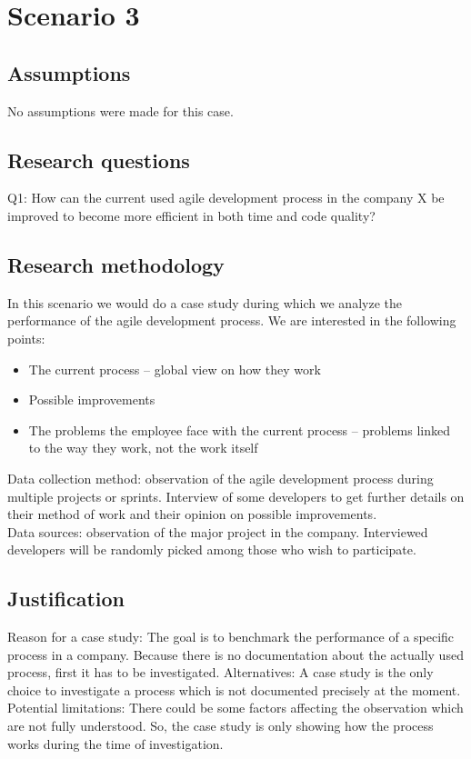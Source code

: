 \documentclass{article}
\begin{document}
\section{Scenario 3}
\subsection{Assumptions}
No assumptions were made for this case.

\subsection{Research questions}
Q1: How can the current used agile development process in the company X be improved to become more efficient in both time and code quality?

\subsection{Research methodology}
In this scenario we would do a case study during which we analyze the performance of the agile development process. We are interested in the following points:
\begin{itemize}
    \item The current process – global view on how they work
    \item Possible improvements
    \item The problems the employee face with the current process – problems linked to the way they work, not the work itself
\end{itemize}
Data collection method: observation of the agile development process during multiple projects or sprints. Interview of some developers to get further details on their method of work and their opinion on possible improvements.\\
Data sources: observation of the major project in the company. Interviewed developers will be randomly picked among those who wish to participate.

\subsection{Justification}
Reason for a case study: The goal is to benchmark the performance of a specific process in a company. Because there is no documentation about the actually used process, first it has to be investigated.
Alternatives: A case study is the only choice to investigate a process which is not documented precisely at the moment. \\ 
Potential limitations: There could be some factors affecting the observation which are not fully understood. So, the case study is only showing how the process works during the time of investigation.
\end{document}
